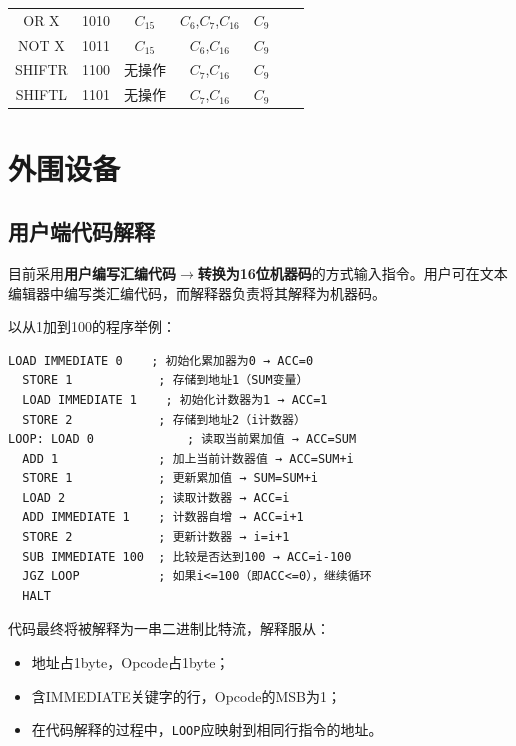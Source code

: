 \documentclass[lang=cn,a4paper,newtx]{elegantpaper}
\begin{document}
\begin{longtable}{ccccccl}
  OR X & 1010 &
  
 $C_{15}$ &
  $C_6$,$C_7$,$C_{16}$ &
  $C_9$ \\

  NOT X & 1011 &
  
 $C_{15}$&
  $C_6$,$C_{16}$ &
  $C_9$ \\

  SHIFTR & 1100 &
  
  无操作 &
  $C_7$,$C_{16}$ &
  $C_9$ \\

  SHIFTL & 1101 &
  
  无操作 &
  $C_7$,$C_{16}$ &
  $C_9$ \\

\end{longtable}





\section{外围设备}
\subsection{用户端代码解释}
目前采用\textbf{用户编写汇编代码}$\to$\textbf{转换为16位机器码}的方式输入指令。用户可在文本编辑器中编写类汇编代码，而解释器负责将其解释为机器码。

以从1加到100的程序举例：
\begin{lstlisting}[language=Assembly]
  LOAD IMMEDIATE 0    ; 初始化累加器为0 → ACC=0
  STORE 1            ; 存储到地址1（SUM变量）
  LOAD IMMEDIATE 1    ; 初始化计数器为1 → ACC=1
  STORE 2            ; 存储到地址2（i计数器）
LOOP: LOAD 0             ; 读取当前累加值 → ACC=SUM
  ADD 1              ; 加上当前计数器值 → ACC=SUM+i
  STORE 1            ; 更新累加值 → SUM=SUM+i
  LOAD 2             ; 读取计数器 → ACC=i
  ADD IMMEDIATE 1    ; 计数器自增 → ACC=i+1
  STORE 2            ; 更新计数器 → i=i+1
  SUB IMMEDIATE 100  ; 比较是否达到100 → ACC=i-100
  JGZ LOOP           ; 如果i<=100（即ACC<=0），继续循环
  HALT
\end{lstlisting}

代码最终将被解释为一串二进制比特流，解释服从：
\begin{itemize}
  \item 地址占1byte，Opcode占1byte；
  \item 含IMMEDIATE关键字的行，Opcode的MSB为1；
  \item 在代码解释的过程中，\texttt{LOOP}应映射到相同行指令的地址。
\end{itemize}
\end{document}
